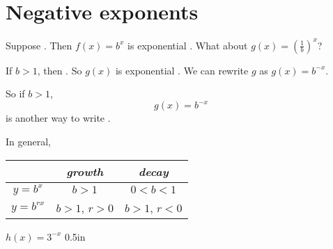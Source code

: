 \section{Negative exponents}

Suppose .
Then $f(x) = b^x$ is exponential .
What about $g(x) = \left(\frac{1}{b}\right)^x$?

If $b>1$, 
then .
So $g(x)$ is exponential .
We can rewrite $g$ as $g(x) = b^{-x}$. 

\begin{tcolorbox}[center,colback=white,width=5in,]
    So
    if $b>1$,
    \[   g(x) = b^{-x}   \]
    is another way to write 
    .
\end{tcolorbox}



In general,
\begin{center}
    \Large
    \renewcommand{\arraystretch}{1.25}
    \begin{tabular}{c||c|c}
        {} & {\bfseries\itshape growth} & {\bfseries\itshape  decay} \\
        \hline
        $y=b^x$ &  $b>1$ & $0<b<1$ \\
        $y=b^{rx}$
            & 
            $b>1$, \quad $r>0$
            &
            $b>1$, \quad $r<0$
            \\
    \end{tabular}
\end{center}




{
    $h(x) = 3^{-x}$
}
{0.5in}
